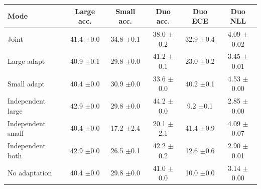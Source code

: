 \begin{table}[t]
\begin{tabular}{lccccc}
        \toprule
        Mode & Large acc. & Small acc. & Duo acc. & Duo ECE & Duo NLL \\
        \midrule
        Joint & 41.4 {\scriptsize$\pm$0.0} & 34.8 {\scriptsize$\pm$0.1} & 38.0 {\scriptsize$\pm$0.2} & 32.9 {\scriptsize$\pm$0.4} & 4.09 {\scriptsize$\pm$0.02} \\
        Large adapt & 40.9 {\scriptsize$\pm$0.1} & 29.8 {\scriptsize$\pm$0.0} & 41.2 {\scriptsize$\pm$0.1} & 23.0 {\scriptsize$\pm$0.2} & 3.45 {\scriptsize$\pm$0.01} \\
        Small adapt & 40.4 {\scriptsize$\pm$0.0} & 30.9 {\scriptsize$\pm$0.0} & 33.6 {\scriptsize$\pm$0.0} & 40.2 {\scriptsize$\pm$0.1} & 4.53 {\scriptsize$\pm$0.00} \\
        \midrule
        Independent large & 42.9 {\scriptsize$\pm$0.0} & 29.8 {\scriptsize$\pm$0.0} & 44.2 {\scriptsize$\pm$0.0} & 9.2 {\scriptsize$\pm$0.1} & 2.85 {\scriptsize$\pm$0.00} \\
        Independent small & 40.4 {\scriptsize$\pm$0.0} & 17.2 {\scriptsize$\pm$2.4} & 20.1 {\scriptsize$\pm$2.1} & 41.4 {\scriptsize$\pm$0.9} & 4.09 {\scriptsize$\pm$0.07} \\
        Independent both & 42.9 {\scriptsize$\pm$0.0} & 26.5 {\scriptsize$\pm$0.1} & 42.2 {\scriptsize$\pm$0.2} & 12.6 {\scriptsize$\pm$0.6} & 2.90 {\scriptsize$\pm$0.01} \\
        \midrule
        No adaptation & 40.4 {\scriptsize$\pm$0.0} & 29.8 {\scriptsize$\pm$0.0} & 41.0 {\scriptsize$\pm$0.0} & 10.0 {\scriptsize$\pm$0.0} & 3.14 {\scriptsize$\pm$0.00} \\
        \bottomrule
    \end{tabular}
\end{table}
